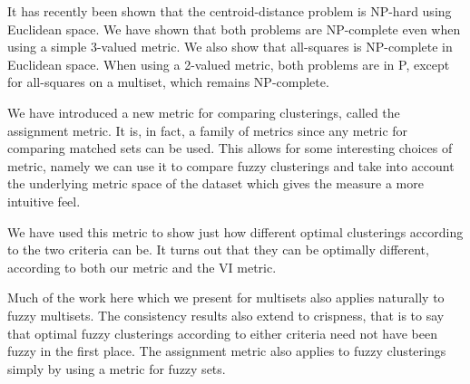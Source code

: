 It has recently been shown that the centroid-distance problem is NP-hard using
Euclidean space.  We have shown that both problems are NP-complete even when
using a simple 3-valued metric.  We also show that all-squares is NP-complete
in Euclidean space.  When using a 2-valued metric, both problems are in P,
except for all-squares on a multiset, which remains NP-complete.

We have introduced a new metric for comparing clusterings, called the
assignment metric.  It is, in fact, a family of metrics since any metric for
comparing matched sets can be used.  This allows for some interesting choices
of metric, namely we can use it to compare fuzzy clusterings and take into
account the underlying metric space of the dataset which gives the measure a
more intuitive feel.

We have used this metric to show just how different optimal clusterings
according to the two criteria can be.  It turns out that they can be optimally
different, according to both our metric and the VI metric.

Much of the work here which we present for multisets also applies naturally to
fuzzy multisets.  The consistency results also extend to crispness, that is to
say that optimal fuzzy clusterings according to either criteria need not have
been fuzzy in the first place.  The assignment metric also applies to fuzzy
clusterings simply by using a metric for fuzzy sets.




